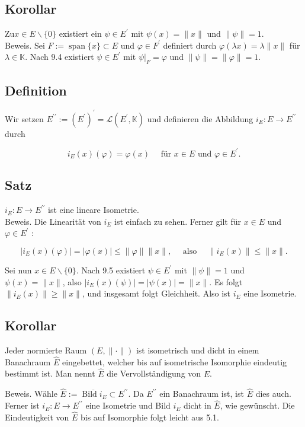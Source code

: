 \documentclass[10pt, letterpaper]{article}
\begin{document}
\subsection*{Korollar}
$\mathrm{Zu} x \in E \backslash\{0\}$ existiert ein $\psi \in E^{\prime}$ mit $\psi(x)=\|x\|$ und $\|\psi\|=1$.\\
Beweis. Sei $F:=\operatorname{span}\{x\} \subset E$ und $\varphi \in F^{\prime}$ definiert durch $\varphi(\lambda x)=\lambda\|x\|$ für $\lambda \in \mathbb{K}$. Nach 9.4 existiert $\psi \in E^{\prime}$ mit $\left.\psi\right|_{F}=\varphi$ und $\|\psi\|=\|\varphi\|=1$.

\subsection*{Definition}
Wir setzen $E^{\prime \prime}:=\left(E^{\prime}\right)^{\prime}=\mathcal{L}\left(E^{\prime}, \mathbb{K}\right)$ und definieren die Abbildung $i_{E}: E \rightarrow E^{\prime \prime}$ durch

$$
i_{E}(x)(\varphi)=\varphi(x) \quad \text { für } x \in E \text { und } \varphi \in E^{\prime} .
$$

\subsection*{Satz}
$i_{E}: E \rightarrow E^{\prime \prime}$ ist eine lineare Isometrie.\\
Beweis. Die Linearität von $i_{E}$ ist einfach zu sehen. Ferner gilt für $x \in E$ und $\varphi \in E^{\prime}$ :

$$
\left|i_{E}(x)(\varphi)\right|=|\varphi(x)| \leq\|\varphi\|\|x\|, \quad \text { also } \quad\left\|i_{E}(x)\right\| \leq\|x\| .
$$

Sei nun $x \in E \backslash\{0\}$. Nach 9.5 existiert $\psi \in E^{\prime}$ mit $\|\psi\|=1$ und $\psi(x)=\|x\|$, also $\left|i_{E}(x)(\psi)\right|=|\psi(x)|=\|x\|$. Es folgt $\left\|i_{E}(x)\right\| \geq\|x\|$, und insgesamt folgt Gleichheit. Also ist $i_{E}$ eine Isometrie.

\subsection*{Korollar}
Jeder normierte Raum $(E,\|\cdot\|)$ ist isometrisch und dicht in einem Banachraum $\hat{E}$ eingebettet, welcher bis auf isometrische Isomorphie eindeutig bestimmt ist. Man nennt $\hat{E}$ die Vervollständigung von $E$.

Beweis. Wähle $\hat{E}:=\overline{\operatorname{Bild} i_{E}} \subset E^{\prime \prime}$. Da $E^{\prime \prime}$ ein Banachraum ist, ist $\hat{E}$ dies auch. Ferner ist $i_{E}: E \rightarrow E^{\prime \prime}$ eine Isometrie und Bild $i_{E}$ dicht in $\hat{E}$, wie gewünscht. Die Eindeutigkeit von $\hat{E}$ bis auf Isomorphie folgt leicht aus 5.1.
\end{document}

